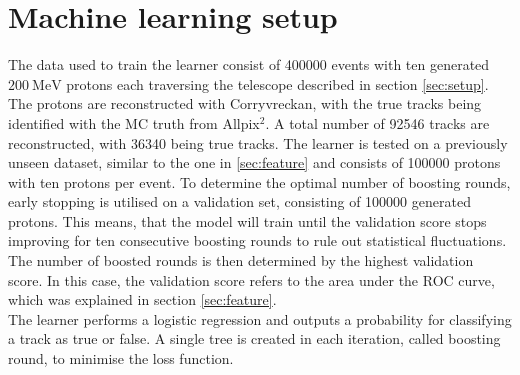 \section{Machine learning setup}
The data used to train the learner %
consist of 400000 events with ten generated $\SI{200}{\mega\eV}$ protons each
traversing the telescope described in section \ref{sec:setup}. The protons
are reconstructed with Corryvreckan, with the true tracks being identified with the MC truth from Allpix$^2$. A total number of 92546 tracks
are reconstructed, with 36340 being true tracks.
The learner is tested on a previously unseen dataset, similar to the one in \ref{sec:feature} and consists of 100000 protons with ten protons per event.
To determine the optimal number of boosting rounds, early stopping is utilised on a validation set, consisting of 100000 generated protons. This means, that
the model will train until the validation score stops improving for ten consecutive boosting rounds to rule out statistical fluctuations.
The number of boosted rounds is then determined by the highest validation score.
In this case, the validation score refers to the area under the ROC curve, which was explained in section \ref{sec:feature}. \\
The learner performs a logistic regression and outputs a probability for classifying a track as true or false.
A single tree is created in each iteration, called boosting round, to minimise the loss function.

